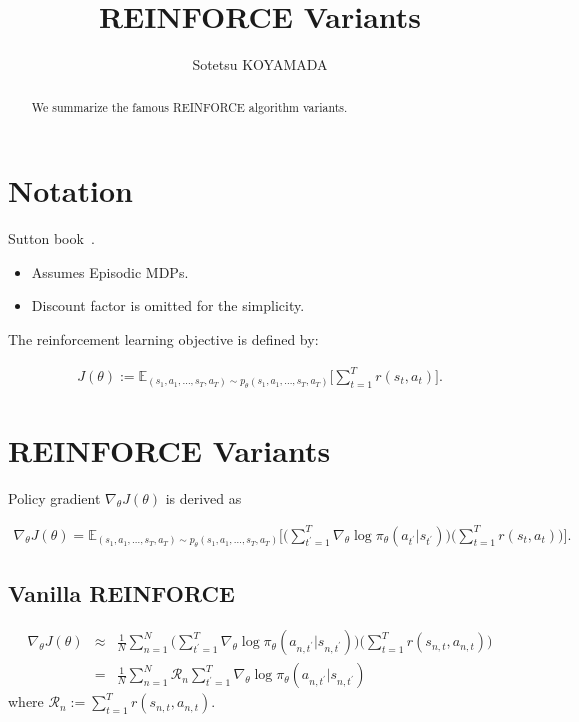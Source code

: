 \documentclass{article}
\title{REINFORCE Variants}
\author{
Sotetsu KOYAMADA
}
\begin{document}
\maketitle

\tableofcontents

\begin{abstract}
We summarize the famous REINFORCE algorithm variants.
\end{abstract}

\section{Notation}
Sutton book~\cite{Sutton2018-ij}.


\begin{itemize}
	\item Assumes Episodic MDPs.
	\item Discount factor is omitted for the simplicity.
\end{itemize}

The reinforcement learning objective is defined by:

\begin{eqnarray}
J(\theta) := \mathbb{E}_{(s_1, a_1, \ldots, s_T, a_T) \sim p_\theta(s_1, a_1, \ldots, s_T, a_T)} \Biggl[ \sum_{t=1}^{T} r(s_t, a_t) \Biggr].
\end{eqnarray}

\section{REINFORCE Variants}

Policy gradient $\nabla_\theta J(\theta)$ is derived as

\begin{eqnarray}
\nabla_\theta J(\theta)
= \mathbb{E}_{(s_1, a_1, \ldots, s_T, a_T) \sim p_\theta(s_1, a_1, \ldots, s_T, a_T)} \Biggl[ \Biggl(\sum_{t^\prime=1}^{T} \nabla_\theta \log \pi_\theta (a_{t^\prime}|s_{t^\prime}) \Biggr) \Biggl( \sum_{t=1}^T r(s_t, a_t) \Biggr) \Biggr].
\end{eqnarray}

\subsection{Vanilla REINFORCE}

\begin{eqnarray}
\nabla_\theta J(\theta)
&\approx& \frac{1}{N} \sum_{n=1}^{N} \Biggl( \sum_{t^\prime=1}^{T} \nabla_\theta \log \pi_\theta (a_{n, t^\prime}|s_{n, t^\prime}) \Biggr) \Biggl( \sum_{t=1}^T r(s_{n, t}, a_{n, t}) \Biggr) \\
&=& \frac{1}{N} \sum_{n=1}^{N} \mathcal{R}_n \sum_{t^\prime=1}^{T} \nabla_\theta \log \pi_\theta (a_{n, t^\prime}|s_{n, t^\prime})
\end{eqnarray}
where $\mathcal{R}_{n} := \sum_{t=1}^T r(s_{n, t}, a_{n, t})$.
\end{document}
